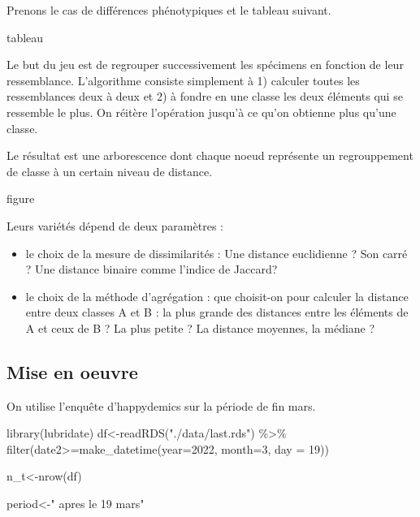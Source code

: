 \documentclass[
]{book}
\newenvironment{Shaded}{\begin{snugshade}}{\end{snugshade}}
\newcommand{\AttributeTok}[1]{\textcolor[rgb]{0.77,0.63,0.00}{#1}}
\newcommand{\DecValTok}[1]{\textcolor[rgb]{0.00,0.00,0.81}{#1}}
\newcommand{\FunctionTok}[1]{\textcolor[rgb]{0.00,0.00,0.00}{#1}}
\newcommand{\NormalTok}[1]{#1}
\newcommand{\OtherTok}[1]{\textcolor[rgb]{0.56,0.35,0.01}{#1}}
\newcommand{\SpecialCharTok}[1]{\textcolor[rgb]{0.00,0.00,0.00}{#1}}
\newcommand{\StringTok}[1]{\textcolor[rgb]{0.31,0.60,0.02}{#1}}
\providecommand{\tightlist}{%
  \setlength{\itemsep}{0pt}\setlength{\parskip}{0pt}}
\begin{document}
Prenons le cas de différences phénotypiques et le tableau suivant.

tableau

Le but du jeu est de regrouper successivement les spécimens en fonction de leur ressemblance. L'algorithme consiste simplement à 1) calculer toutes les ressemblances deux à deux et 2) à fondre en une classe les deux éléments qui se ressemble le plus. On réitère l'opération jusqu'à ce qu'on obtienne plus qu'une classe.

Le résultat est une arborescence dont chaque noeud représente un regrouppement de classe à un certain niveau de distance.

figure

Leurs variétés dépend de deux paramètres :

\begin{itemize}
\tightlist
\item
  le choix de la mesure de dissimilarités : Une distance euclidienne ? Son carré ? Une distance binaire comme l'indice de Jaccard?
\item
  le choix de la méthode d'agrégation : que choisit-on pour calculer la distance entre deux classes A et B : la plus grande des distances entre les éléments de A et ceux de B ? La plus petite ? La distance moyennes, la médiane ?
\end{itemize}

\hypertarget{mise-en-oeuvre}{%
\subsection{Mise en oeuvre}\label{mise-en-oeuvre}}

On utilise l'enquête d'happydemics sur la période de fin mars.

\begin{Shaded}
\begin{Highlighting}[]
\FunctionTok{library}\NormalTok{(lubridate)}
\NormalTok{df}\OtherTok{\textless{}{-}}\FunctionTok{readRDS}\NormalTok{(}\StringTok{"./data/last.rds"}\NormalTok{) }\SpecialCharTok{\%\textgreater{}\%}
  \FunctionTok{filter}\NormalTok{(date2}\SpecialCharTok{\textgreater{}=}\FunctionTok{make\_datetime}\NormalTok{(}\AttributeTok{year=}\DecValTok{2022}\NormalTok{, }\AttributeTok{month=}\DecValTok{3}\NormalTok{, }\AttributeTok{day =} \DecValTok{19}\NormalTok{))}


\NormalTok{n\_t}\OtherTok{\textless{}{-}}\FunctionTok{nrow}\NormalTok{(df)}

\NormalTok{period}\OtherTok{\textless{}{-}}\StringTok{" apres le 19 mars"}
\end{Highlighting}
\end{Shaded}
\end{document}

